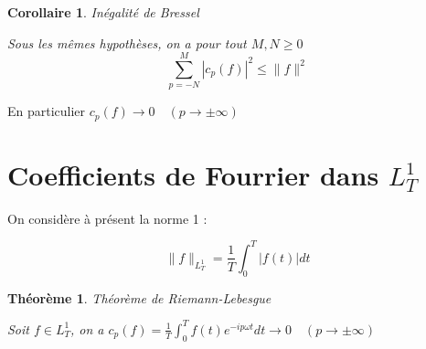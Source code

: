 \documentclass[]{article}
\newtheorem{mythm}{Théorème}
\newtheorem{mycor}{Corollaire}
\theoremstyle{remark}
\theoremstyle{definition}
\begin{document}
\begin{mycor}Inégalité de Bressel

	Sous les mêmes hypothèses, on a pour tout $M, N \geqslant 0$ $$\sum_{p=-N}^{M} |c_p(f)|^2 \leqslant \|f\|^2$$
\end{mycor}

En particulier $c_p(f) \longrightarrow 0 \quad (p \rightarrow \pm \infty)$

\section{Coefficients de Fourrier dans $L^1_T$}

On considère à présent la norme 1 :

$$\|f\|_{L_T^1} = \frac{1}{T} \int_{0}^{T} |f(t)| dt$$

\begin{mythm}Théorème de Riemann-Lebesgue

	Soit $f \in L^1_T$, on a $\displaystyle c_p(f) = \frac{1}{T} \int_{0}^{T} f(t) e^{-i p \omega t} dt \longrightarrow 0 \quad (p \rightarrow \pm \infty)$
\end{mythm}
\end{document}
